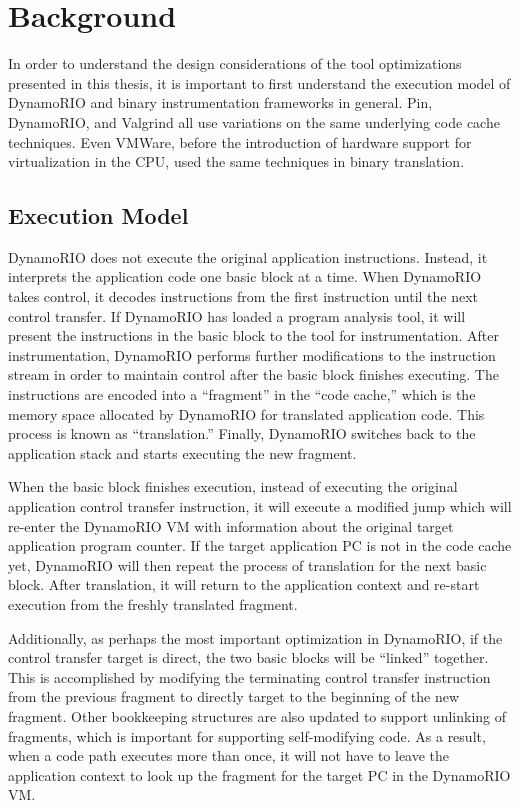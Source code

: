 \chapter{Background}
\label{sec:background}


In order to understand the design considerations of the tool optimizations
presented in this thesis, it is important to first understand the execution
model of DynamoRIO and binary instrumentation frameworks in general.
Pin\cite{pin}, DynamoRIO, and Valgrind\cite{valgrind} all use variations on the
same underlying code cache techniques.  Even VMWare, before the introduction of
hardware support for virtualization in the CPU, used the same techniques in
binary translation.\cite{vmware_comparison}

\section{Execution Model}

DynamoRIO does not execute the original application instructions.  Instead, it
interprets the application code one basic block at a time.  When DynamoRIO takes
control, it decodes instructions from the first instruction until the next
control transfer.  If DynamoRIO has loaded a program analysis tool, it will
present the instructions in the basic block to the tool for instrumentation.
After instrumentation, DynamoRIO performs further modifications to the
instruction stream in order to maintain control after the basic block finishes
executing.  The instructions are encoded into a ``fragment'' in the ``code
cache,'' which is the memory space allocated by DynamoRIO for translated
application code.  This process is known as ``translation.''  Finally, DynamoRIO
switches back to the application stack and starts executing the new fragment.

When the basic block finishes execution, instead of executing the original
application control transfer instruction, it will execute a modified jump which
will re-enter the DynamoRIO VM with information about the original target
application program counter.  If the target application PC is not in the code
cache yet, DynamoRIO will then repeat the process of translation for the next
basic block.  After translation, it will return to the application context and
re-start execution from the freshly translated fragment.

Additionally, as perhaps the most important optimization in DynamoRIO, if the
control transfer target is direct, the two basic blocks will be ``linked''
together.  This is accomplished by modifying the terminating control transfer
instruction from the previous fragment to directly target to the beginning of
the new fragment.  Other bookkeeping structures are also updated to support
unlinking of fragments, which is important for supporting self-modifying code.
As a result, when a code path executes more than once, it will not have to leave
the application context to look up the fragment for the target PC in the
DynamoRIO VM.

